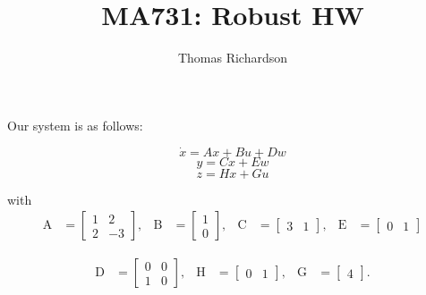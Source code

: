 \documentclass[12pt, notitlepage, letterpaper]{article}
\title{MA731: Robust HW}
\author{Thomas Richardson}
{\large }
\begin{document}

\baselineskip 24pt


\maketitle

\noindent

\paragraph{}

Our system is as follows:

\begin{equation}
\label{eq:sys01}
\dot{x} = Ax + Bu + Dw
\end{equation}
\begin{equation}
\label{eq:sys02}
y = Cx + Ew
\end{equation}
\begin{equation}
\label{eq:sys03}
z = Hx + Gu
\end{equation}

with
\begin{align}
\label{eq:ABSQRBC}
\text{A} 
&=
\begin{bmatrix}
1 & 2 \\
2 & -3
\end{bmatrix}
,&
\text{B}
&=
\begin{bmatrix}
1 \\
0
\end{bmatrix}
,&
\text{C}
&=
\begin{bmatrix}
3 &  1 
\end{bmatrix}
,&
\text{E}
&=
\begin{bmatrix}
0 &  1 
\end{bmatrix}
\end{align}


\begin{align}
\text{D} 
&=
\begin{bmatrix}
0 & 0 \\
1 & 0
\end{bmatrix}
,&
\text{H}
&=
\begin{bmatrix}
0 &  1 
\end{bmatrix}
,&
\text{G}
&=
\begin{bmatrix}
4
\end{bmatrix}.
\end{align}
\end{document}
